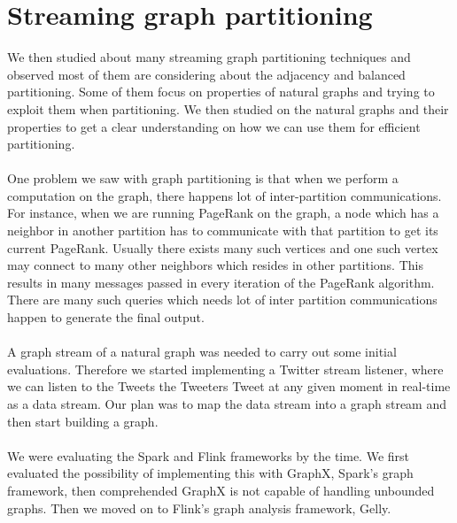 \documentclass[12pt]{report}
\numberwithin{figure}{section}
\numberwithin{table}{section}
\begin{document}
\section{Streaming graph partitioning}
We then studied about many streaming graph partitioning techniques and observed most of them are considering about the adjacency and balanced partitioning. Some of them focus on properties of natural graphs and trying to exploit them when partitioning. We then studied on the natural graphs and their properties to get a clear understanding on how we can use them for efficient partitioning. 

\paragraph{}

One problem we saw with graph partitioning  is that when we perform a computation on the graph, there happens lot of inter-partition communications. For instance, when we are running PageRank on the graph, a node which has a neighbor in another partition has to communicate with that partition to get its current PageRank. Usually there exists many such vertices and one such vertex may connect to many other neighbors which resides in other partitions. This results in many messages passed in every iteration of the PageRank algorithm. There are many such queries which needs lot of inter partition communications happen to generate the final output.

\paragraph{}

A graph stream of a natural graph was needed to carry out some initial evaluations. Therefore we started implementing a Twitter stream listener, where we can listen to the Tweets the Tweeters Tweet at any given moment in real-time as a data stream. Our plan was to map the data stream into a graph stream and then start building a graph. 

\paragraph{}

We were evaluating the Spark and Flink frameworks by the time. We first evaluated the possibility of implementing this with GraphX, Spark’s graph framework, then comprehended GraphX is not capable of handling unbounded graphs. Then we moved on to Flink’s graph analysis framework, Gelly. 
\end{document}

